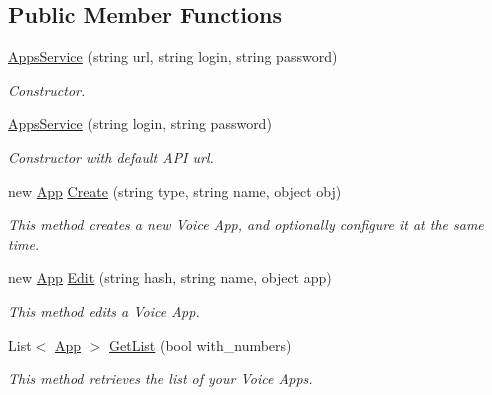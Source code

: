 \subsection*{Public Member Functions}
\begin{DoxyCompactItemize}
\item 
\hyperlink{class_thecallr_api_1_1_services_1_1_client_1_1_apps_service_a97282749e4df37a6a868e4f1b8583c9b}{Apps\+Service} (string url, string login, string password)
\begin{DoxyCompactList}\small\item\em Constructor. \end{DoxyCompactList}\item 
\hyperlink{class_thecallr_api_1_1_services_1_1_client_1_1_apps_service_a8fd8c9bb958d97f3b69642af4775a64d}{Apps\+Service} (string login, string password)
\begin{DoxyCompactList}\small\item\em Constructor with default A\+P\+I url. \end{DoxyCompactList}\item 
new \hyperlink{class_thecallr_api_1_1_objects_1_1_app_1_1_app}{App} \hyperlink{class_thecallr_api_1_1_services_1_1_client_1_1_apps_service_a2a1d864f27e3bb3a40baee6dd13f7905}{Create} (string type, string name, object obj)
\begin{DoxyCompactList}\small\item\em This method creates a new Voice App, and optionally configure it at the same time. \end{DoxyCompactList}\item 
new \hyperlink{class_thecallr_api_1_1_objects_1_1_app_1_1_app}{App} \hyperlink{class_thecallr_api_1_1_services_1_1_client_1_1_apps_service_a46d1378375b6a13b283e5069c8cbb0fb}{Edit} (string hash, string name, object app)
\begin{DoxyCompactList}\small\item\em This method edits a Voice App. \end{DoxyCompactList}\item 
List$<$ \hyperlink{class_thecallr_api_1_1_objects_1_1_app_1_1_app}{App} $>$ \hyperlink{class_thecallr_api_1_1_services_1_1_client_1_1_apps_service_a3080b4e19eaa8418836f79a85e0959be}{Get\+List} (bool with\+\_\+numbers)
\begin{DoxyCompactList}\small\item\em This method retrieves the list of your Voice Apps. \end{DoxyCompactList}\end{DoxyCompactItemize}
